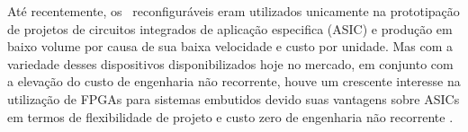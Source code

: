 	Até recentemente, os \hardwares\ reconfiguráveis eram utilizados unicamente na prototipação de projetos de circuitos integrados de aplicação especifica (ASIC) e produção em baixo volume por causa de sua baixa velocidade e custo por unidade.
	Mas com a variedade desses dispositivos disponibilizados hoje no mercado, em conjunto com a elevação do custo de engenharia não recorrente, houve um crescente interesse na utilização de FPGAs para sistemas embutidos devido suas vantagens sobre ASICs em termos de flexibilidade de projeto e custo zero de engenharia não recorrente \cite{Mei2000}. 

